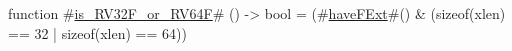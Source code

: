 function #\hyperref[sailRISCVziszyRV32FzyorzyRV64F]{is\_RV32F\_or\_RV64F}# () -> bool = (#\hyperref[sailRISCVzhaveFExt]{haveFExt}#() & (sizeof(xlen) == 32 | sizeof(xlen) == 64))
